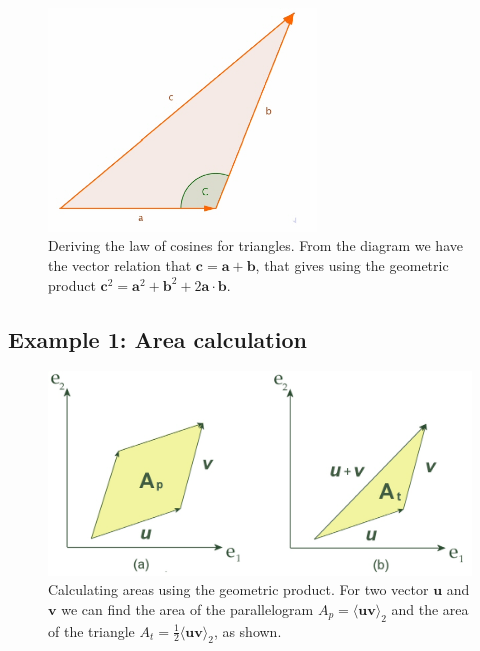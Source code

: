 \documentclass[prb,preprint]{revtex4}
\begin{document}
\begin{figure}[htb]
\begin{center}
\includegraphics[width=2.8in]{cosRule}
\end{center}
\caption{Deriving the law of cosines for triangles. From the diagram we have the vector relation that $ \boldsymbol{c} = \boldsymbol{a} + \boldsymbol{b} $, that gives using the geometric product $ \boldsymbol{c}^2 = \boldsymbol{a}^2 +  \boldsymbol{b}^2 + 2 \boldsymbol{a} \cdot \boldsymbol{b} $.  \label{CosRule}}
\end{figure}



\subsection{Example 1: Area calculation}


\begin{figure}[htb]

\begin{center}
\includegraphics[width=4.8in]{AreaCalcv3}
\end{center}

\caption{Calculating areas using the geometric product. For two vector $ \boldsymbol{u} $ and $ \boldsymbol{v} $ we can find the area of the parallelogram $ A_p = \langle \boldsymbol{u} \boldsymbol{v} \rangle_2 $ and the area of the triangle $ A_t = \frac{1}{2} \langle \boldsymbol{u} \boldsymbol{v} \rangle_2 $, as shown. \label{TwoVectors}}

\end{figure}
\end{document}
